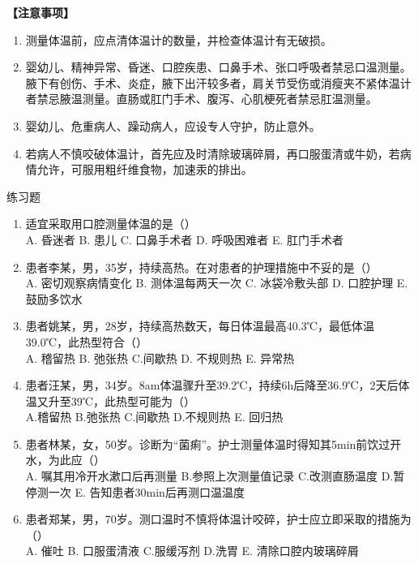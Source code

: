 \documentclass[11pt, a4paper]{ctexart}
\begin{document}
\textbf{【注意事项】}
\begin{enumerate}
	\item 测量体温前，应点清体温计的数量，并检查体温计有无破损。
	\item 婴幼儿、精神异常、昏迷、口腔疾患、口鼻手术、张口呼吸者禁忌口温测量。腋下有创伤、手术、炎症，腋下出汗较多者，肩关节受伤或消瘦夹不紧体温计者禁忌腋温测量。直肠或肛门手术、腹泻、心肌梗死者禁忌肛温测量。
	\item 婴幼儿、危重病人、躁动病人，应设专人守护，防止意外。
	\item 若病人不慎咬破体温计，首先应及时清除玻璃碎屑，再口服蛋清或牛奶，若病情允许，可服用粗纤维食物，加速汞的排出。
\end{enumerate}

\begin{examplebox}{练习题}
	\begin{enumerate}
		\item 适宜采取用口腔测量体温的是（\qquad）\\
		      A. 昏迷者 \quad B. 患儿 \quad C. 口鼻手术者 \quad D. 呼吸困难者 \quad E. 肛门手术者
		\item 患者李某，男，35岁，持续高热。在对患者的护理措施中不妥的是（\qquad）\\
		      A. 密切观察病情变化 \quad B. 测体温每两天一次 \quad C. 冰袋冷敷头部 \quad D. 口腔护理 \quad E. 鼓励多饮水
		\item 患者姚某，男，28岁，持续高热数天，每日体温最高40.3℃，最低体温39.0℃，此热型符合（\qquad）\\
		      A. 稽留热 \quad B. 弛张热 \quad C.间歇热 \quad D. 不规则热 \quad E. 异常热
		\item 患者汪某，男，34岁。8am体温骤升至39.2℃，持续6h后降至36.9℃，2天后体温又升至39℃，此热型可能为（\qquad）\\
		      A.稽留热 \quad B.弛张热 \quad C.间歇热 \quad D.不规则热 \quad E. 回归热
		\item 患者林某，女，50岁。诊断为“菌痢”。护士测量体温时得知其5min前饮过开水，为此应（\qquad）\\
		      A. 嘱其用冷开水漱口后再测量 \quad B.参照上次测量值记录 \quad C.改测直肠温度 \quad D.暂停测一次 \quad E. 告知患者30min后再测口温温度
		\item 患者郑某，男，70岁。测口温时不慎将体温计咬碎，护士应立即采取的措施为（\qquad）\\
		      A. 催吐 \quad B. 口服蛋清液 \quad C.服缓泻剂 \quad D.洗胃 \quad E. 清除口腔内玻璃碎屑
	\end{enumerate}
\end{examplebox}
\end{document}
